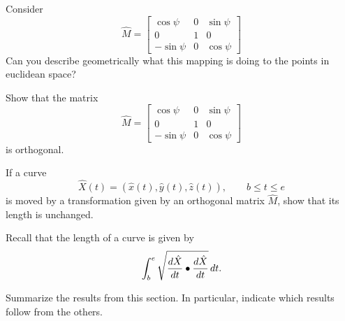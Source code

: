 \documentclass{ximera}
\begin{document}
\begin{problem}
  Consider
  \[
  \hat{M}=\begin{bmatrix}
  \cos\psi & 0 & \sin\psi\\
  0 & 1 & 0\\
  -\sin\psi & 0 & \cos\psi
  \end{bmatrix}
  \]
  Can you describe geometrically what this mapping is doing
  to the points in euclidean space?
\end{problem}


\begin{problem}
Show that the matrix%
\[
\hat{M}=\begin{bmatrix}
%
\cos\psi & 0 & \sin\psi\\
0 & 1 & 0\\
-\sin\psi & 0 & \cos\psi
\end{bmatrix}
\]
is orthogonal.
\end{problem}


\begin{problem}
If a curve
\[
\hat{X}(t) = \left(\hat{x}(t),\hat{y}(t),\hat{z}(t)\right),\qquad b\le t\le e
\]
is moved by a transformation given by an orthogonal matrix $\hat{M}$,
show that its length is unchanged.
\begin{hint}
  Recall that the length of a curve is given by
\[
\int_{b}^{e} \sqrt{\frac{d\hat{X}}{dt} \bullet \frac{d\hat{X}}{dt}}\,d t.
\]  
\end{hint}
\end{problem}


\begin{problem}
Summarize the results from this section. In particular, indicate which
results follow from the others.
\begin{freeResponse}
\end{freeResponse}
\end{problem}
\end{document}

